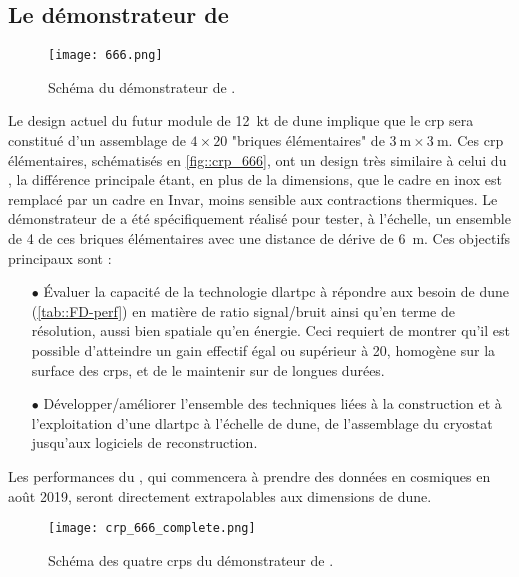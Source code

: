     \subsection{Le démonstrateur de \SSS{}}
      \begin{figure}[htbp]
        \centering
        \texttt{[image: 666.png]}        
        \caption[Schéma du démonstrateur de \SSS{}.]{\label{fig::666}Schéma du démonstrateur de \SSS{}.}
      \end{figure}

      Le design actuel du futur module de \SI{12}{\kilo\tonne}\cite{Acciarri2016a} de \gls{dune} implique que le \gls{crp} sera constitué d'un assemblage de $4\times20$ "briques élémentaires" de $\SI{3}{\meter}\times\SI{3}{\meter}$. Ces \gls{crp} élémentaires, schématisés en \autoref{fig::crp_666}, ont un design très similaire à celui du \TOO{}, la différence principale étant, en plus de la dimensions, que le cadre en inox est remplacé par un cadre en Invar, moins sensible aux contractions thermiques. Le démonstrateur de \SSS{} a été spécifiquement réalisé pour tester, à l'échelle, un ensemble de 4 de ces briques élémentaires avec une distance de dérive de \SI{6}{\meter}. Ces objectifs principaux sont :
      \begin{itemize}
        \item[$\bullet$] Évaluer la capacité de la technologie \gls{dlartpc} à répondre aux besoin de \gls{dune} (\autoref{tab::FD-perf}) en matière de ratio signal/bruit ainsi qu'en terme de résolution, aussi bien spatiale qu'en énergie. Ceci requiert de montrer qu'il est possible d'atteindre un gain effectif égal ou supérieur à 20, homogène sur la surface des \glspl{crp}, et de le maintenir sur de longues durées.
        \item[$\bullet$] Développer/améliorer l'ensemble des techniques liées à la construction et à l'exploitation d'une \gls{dlartpc} à l'échelle de \gls{dune}, de l'assemblage du cryostat jusqu'aux logiciels de reconstruction.
      \end{itemize}
      Les performances du \SSS{}, qui commencera à prendre des données en cosmiques en août 2019, seront directement extrapolables aux dimensions de \gls{dune}.

      \begin{figure}[htbp]
        \centering
        \texttt{[image: crp\_666\_complete.png]}
        \caption[Schéma des CRPs du \SSS{}.]{\label{fig::crp_666}Schéma des quatre \glspl{crp} du démonstrateur de \SSS{}.}
      \end{figure}

